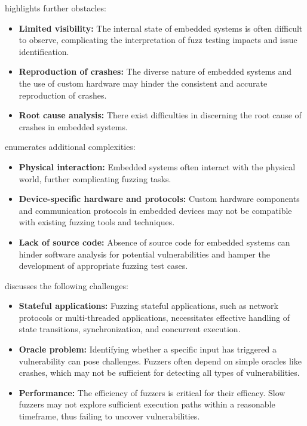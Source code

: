  highlights further obstacles:
\begin{itemize}
\item \textbf{Limited visibility:} The internal state of embedded systems is often difficult to observe, complicating the interpretation of fuzz testing impacts and issue identification\cite{muench2018you}.
\item \textbf{Reproduction of crashes:} The diverse nature of embedded systems and the use of custom hardware may hinder the consistent and accurate reproduction of crashes\cite{muench2018you}.
\item \textbf{Root cause analysis:} There exist difficulties in discerning the root cause of crashes in embedded systems\cite{muench2018you}.
\end{itemize}

 enumerates additional complexities:
\begin{itemize}
\item \textbf{Physical interaction:} Embedded systems often interact with the physical world, further complicating fuzzing tasks\cite{eisele2022embedded}.
\item \textbf{Device-specific hardware and protocols:} Custom hardware components and communication protocols in embedded devices may not be compatible with existing fuzzing tools and techniques\cite{eisele2022embedded}.
\item \textbf{Lack of source code:} Absence of source code for embedded systems can hinder software analysis for potential vulnerabilities and hamper the development of appropriate fuzzing test cases\cite{eisele2022embedded}.
\end{itemize}

 discusses the following challenges:
\begin{itemize}
\item \textbf{Stateful applications:} Fuzzing stateful applications, such as network protocols or multi-threaded applications, necessitates effective handling of state transitions, synchronization, and concurrent execution\cite{manes2019art}.
\item \textbf{Oracle problem:} Identifying whether a specific input has triggered a vulnerability can pose challenges. Fuzzers often depend on simple oracles like crashes, which may not be sufficient for detecting all types of vulnerabilities\cite{manes2019art}.
\item \textbf{Performance:} The efficiency of fuzzers is critical for their efficacy. Slow fuzzers may not explore sufficient execution paths within a reasonable timeframe, thus failing to uncover vulnerabilities\cite{manes2019art}.
\end{itemize}

